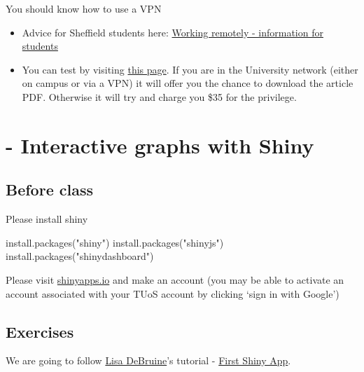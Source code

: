 \documentclass[
]{book}
\newenvironment{Shaded}{\begin{snugshade}}{\end{snugshade}}
\newcommand{\FunctionTok}[1]{\textcolor[rgb]{0.00,0.00,0.00}{#1}}
\newcommand{\NormalTok}[1]{#1}
\newcommand{\StringTok}[1]{\textcolor[rgb]{0.31,0.60,0.02}{#1}}
\providecommand{\tightlist}{%
  \setlength{\itemsep}{0pt}\setlength{\parskip}{0pt}}
\begin{document}
You should know how to use a VPN

\begin{itemize}
\tightlist
\item
  Advice for Sheffield students here: \href{https://www.sheffield.ac.uk/it-services/remote/students}{Working remotely - information for students}
\item
  You can test by visiting \href{https://journals.sagepub.com/doi/full/10.1177/0956797613511466}{this page}. If you are in the University network (either on campus or via a VPN) it will offer you the chance to download the article PDF. Otherwise it will try and charge you \$35 for the privilege.
\end{itemize}

\hypertarget{interactive-graphs-with-shiny}{%
\chapter*{- Interactive graphs with Shiny}\label{interactive-graphs-with-shiny}}


\hypertarget{before-class}{%
\section{Before class}\label{before-class}}

Please install shiny

\begin{Shaded}
\begin{Highlighting}[]
\FunctionTok{install.packages}\NormalTok{(}\StringTok{"shiny"}\NormalTok{)}
\FunctionTok{install.packages}\NormalTok{(}\StringTok{"shinyjs"}\NormalTok{)}
\FunctionTok{install.packages}\NormalTok{(}\StringTok{"shinydashboard"}\NormalTok{)}
\end{Highlighting}
\end{Shaded}

Please visit \href{https://www.shinyapps.io/}{shinyapps.io} and make an account (you may be able to activate an account associated with your TUoS account by clicking `sign in with Google')

\hypertarget{exercises-5}{%
\section{Exercises}\label{exercises-5}}

We are going to follow \href{https://debruine.github.io/}{Lisa DeBruine}'s tutorial - \href{https://psyteachr.github.io/shiny-tutorials/01-first-app.html}{First Shiny App}.
\end{document}
